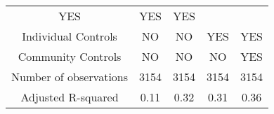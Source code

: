 \begin{tabular}{lllll}
  \multicolumn{1}{c}{YES} &
  \multicolumn{1}{c}{YES} &
  \multicolumn{1}{c}{YES} \\
\multicolumn{1}{c}{Individual Controls} &
  \multicolumn{1}{c}{NO} &
  \multicolumn{1}{c}{NO} &
  \multicolumn{1}{c}{YES} &
  \multicolumn{1}{c}{YES} \\
\multicolumn{1}{c}{Community Controls} &
  \multicolumn{1}{c}{NO} &
  \multicolumn{1}{c}{NO} &
  \multicolumn{1}{c}{NO} &
  \multicolumn{1}{c}{YES} \\
\multicolumn{1}{c}{Number of observations} &
  \multicolumn{1}{c}{3154} &
  \multicolumn{1}{c}{3154} &
  \multicolumn{1}{c}{3154} &
  \multicolumn{1}{c}{3154} \\
\multicolumn{1}{c}{Adjusted R-squared} &
  \multicolumn{1}{c}{0.11} &
  \multicolumn{1}{c}{0.32} &
  \multicolumn{1}{c}{0.31} &
  \multicolumn{1}{c}{0.36} \\
\cline{1-5}
\end{tabular}
